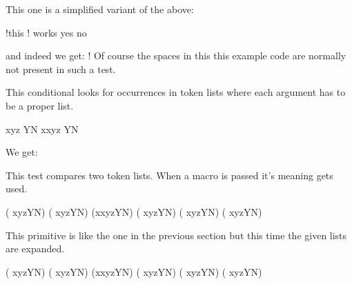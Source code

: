 \stopoldprimitive

\startnewprimitive[title={\prm {ifhaschar}}]

This one is a simplified variant of the above:

\startbuffer
\ifhaschar !{this ! works} yes \else no \fi
\stopbuffer

\typebuffer

and indeed we get: \inlinebuffer ! Of course the spaces in this this example
code are normally not present in such a test.

\stopnewprimitive

\startnewprimitive[title={\prm {ifhastok}}]

This conditional looks for occurrences in token lists where each argument has to
be a proper list.

\startbuffer
\def\scratchtoks{x}

         {xyz} Y\else N\fi\quad
\ifhastoks\scratchtoks {xyz} Y\else N\fi
\stopbuffer

\typebuffer

We get:

{\getbuffer}

\stopnewprimitive

\startnewprimitive[title={\prm {ifhastoks}}]

This test compares two token lists. When a macro is passed it's meaning
gets used.

\startbuffer
\def\x  {x}
\def\xyz{xyz}

(  {xyz}Y\else N\fi)\quad
(\ifhastoks {\x}  {xyz}Y\else N\fi)\quad
(\ifhastoks  \x   {xyz}Y\else N\fi)\quad
(  {xyz}Y\else N\fi)\quad
(  {xyz}Y\else N\fi)\quad
( {\xyz}Y\else N\fi)
\stopbuffer

\typebuffer {\getbuffer}

\stopnewprimitive

\startnewprimitive[title={\prm {ifhasxtoks}}]

This primitive is like the one in the previous section but this time the
given lists are expanded.

\startbuffer
\def\x  {x}
\def\xyz{\x yz}

(  {xyz}Y\else N\fi)\quad
(\ifhasxtoks {\x}  {xyz}Y\else N\fi)\quad
(\ifhastoks   \x   {xyz}Y\else N\fi)\quad
(  {xyz}Y\else N\fi)\quad
(  {xyz}Y\else N\fi)\quad
( {\xyz}Y\else N\fi)
\stopbuffer

\typebuffer {\getbuffer}

